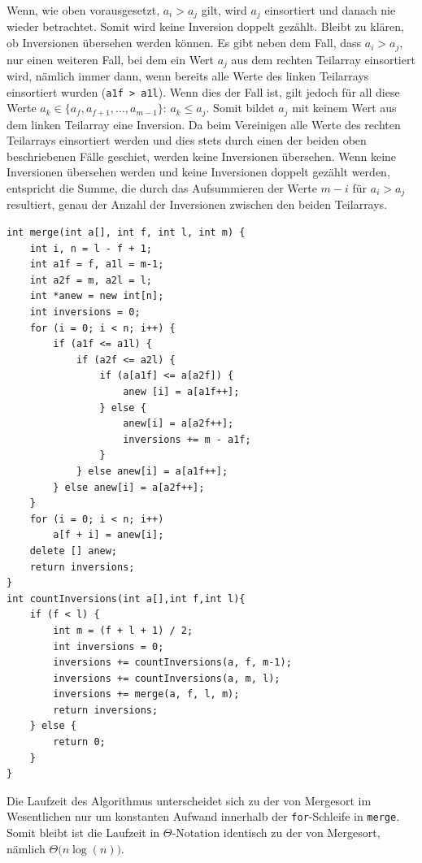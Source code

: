 \documentclass[11pt,a4paper]{article}
\begin{document}
\begin{loesung}
    Wenn, wie oben vorausgesetzt, $a_i > a_j$ gilt, wird $a_j$ einsortiert und danach nie wieder betrachtet.
    Somit wird keine Inversion doppelt gezählt.
    Bleibt zu klären, ob Inversionen übersehen werden können.
    Es gibt neben dem Fall, dass $a_i > a_j$, nur einen weiteren Fall, bei dem ein Wert $a_j$ aus dem rechten Teilarray einsortiert wird, nämlich immer dann, wenn bereits alle Werte des linken Teilarrays einsortiert wurden (\texttt{a1f > a1l}).
    Wenn dies der Fall ist, gilt jedoch für all diese Werte $a_k \in \{a_f, a_{f + 1}, \ldots, a_{m - 1}\}$: $a_k \leq a_j$.
    Somit bildet $a_j$ mit keinem Wert aus dem linken Teilarray eine Inversion.
    Da beim Vereinigen alle Werte des rechten Teilarrays einsortiert werden und dies stets durch einen der beiden oben beschriebenen Fälle geschiet, werden keine Inversionen übersehen.
    Wenn keine Inversionen übersehen werden und keine Inversionen doppelt gezählt werden, entspricht die Summe, die durch das Aufsummieren der Werte $m - i$ für $a_i > a_j$ resultiert, genau der Anzahl der Inversionen zwischen den beiden Teilarrays.

    \begin{lstlisting}
int merge(int a[], int f, int l, int m) {
    int i, n = l - f + 1;
    int a1f = f, a1l = m-1;
    int a2f = m, a2l = l;
    int *anew = new int[n];
    int inversions = 0;
    for (i = 0; i < n; i++) {
        if (a1f <= a1l) {
            if (a2f <= a2l) {
                if (a[a1f] <= a[a2f]) {
                    anew [i] = a[a1f++];
                } else {
                    anew[i] = a[a2f++];
                    inversions += m - a1f;
                }
            } else anew[i] = a[a1f++];
        } else anew[i] = a[a2f++];
    }
    for (i = 0; i < n; i++)
        a[f + i] = anew[i];
    delete [] anew;
    return inversions;
}
int countInversions(int a[],int f,int l){
    if (f < l) {
        int m = (f + l + 1) / 2;
        int inversions = 0;
        inversions += countInversions(a, f, m-1);
        inversions += countInversions(a, m, l);
        inversions += merge(a, f, l, m);
        return inversions;
    } else {
        return 0;
    }
}
    \end{lstlisting}

    Die Laufzeit des Algorithmus unterscheidet sich zu der von Mergesort im Wesentlichen nur um konstanten Aufwand innerhalb der \texttt{for}-Schleife in \texttt{merge}.
    Somit bleibt ist die Laufzeit in $\Theta$-Notation identisch zu der von Mergesort, nämlich $\Theta\big(n \log(n)\big)$.
\end{loesung}
\end{document}
